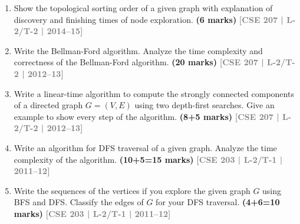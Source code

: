 \documentclass[12pt]{article}
\newcommand{\yr}[1]{\hfill\textcolor{gray}{\small\textbf{[#1]}}}
\newcommand{\mk}[1]{\textcolor{orange!70!black}{\small\textbf{(#1 marks)}}}
\begin{document}
\begin{enumerate}
\item Show the topological sorting order of a given graph with explanation of discovery and finishing times of node exploration. \mk{6}
\yr{CSE 207 | L-2/T-2 | 2014--15}

\begin{center}
\end{center}


\item Write the Bellman-Ford algorithm. Analyze the time complexity and correctness of the Bellman-Ford algorithm. \mk{20}
\yr{CSE 207 | L-2/T-2 | 2012--13}


\item Write a linear-time algorithm to compute the strongly connected components of a directed graph $G = (V, E)$ using two depth-first searches. Give an example to show every step of the algorithm. \mk{8+5}
\yr{CSE 207 | L-2/T-2 | 2012--13}


\item Write an algorithm for DFS traversal of a given graph. Analyze the time
complexity of the algorithm.
 \mk{10+5=15} \yr{CSE 203 | L-2/T-1 | 2011--12}


\item Write the sequences of the vertices if you explore the given graph $G$ using BFS and DFS. Classify the edges of $G$ for your DFS traversal. \mk{4+6=10}
\yr{CSE 203 | L-2/T-1 | 2011--12}

\begin{center}
\end{center}
\end{enumerate}
\end{document}
